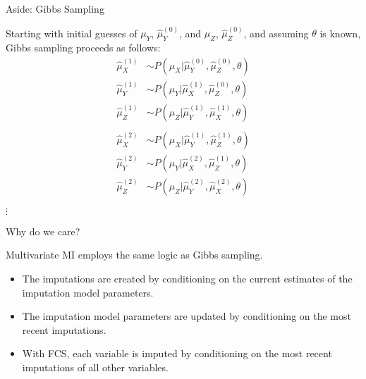 \documentclass[10pt]{beamer}\usepackage[]{graphicx}\usepackage[]{color}
\begin{document}
\begin{frame}{Aside: Gibbs Sampling}
  
  Starting with initial guesses of $\mu_Y$, $\hat{\mu}_Y^{(0)}$, and
  $\mu_Z$, $\hat{\mu}_Z^{(0)}$, and assuming $\theta$ is known, Gibbs
  sampling proceeds as follows:
  \begin{align*}
    \hat{\mu}_X^{(1)} &\sim P(\mu_X | \hat{\mu}_Y^{(0)}, \hat{\mu}_Z^{(0)}, \theta)\\
    \hat{\mu}_Y^{(1)} &\sim P(\mu_Y | \hat{\mu}_X^{(1)}, \hat{\mu}_Z^{(0)}, \theta)\\
    \hat{\mu}_Z^{(1)} &\sim P(\mu_Z | \hat{\mu}_Y^{(1)}, \hat{\mu}_X^{(1)}, \theta)\\
    \\
    \hat{\mu}_X^{(2)} &\sim P(\mu_X | \hat{\mu}_Y^{(1)}, \hat{\mu}_Z^{(1)}, \theta)\\
    \hat{\mu}_Y^{(2)} &\sim P(\mu_Y | \hat{\mu}_X^{(2)}, \hat{\mu}_Z^{(1)}, \theta)\\
    \hat{\mu}_Z^{(2)} &\sim P(\mu_Z | \hat{\mu}_Y^{(2)}, \hat{\mu}_X^{(2)}, \theta)
  \end{align*}
  \vspace{-40pt}
  \begin{center}\huge{$\vdots$}\end{center}
  
\end{frame}


\begin{frame}{Why do we care?}
  
  Multivariate MI employs the same logic as Gibbs sampling.
  \vb
  \begin{itemize}
  \item The imputations are created by conditioning on the current estimates of 
    the imputation model parameters.
    \vb
  \item The imputation model parameters are updated by conditioning on the most 
    recent imputations.
    \vb
  \item With FCS, each variable is imputed by conditioning on the most recent 
    imputations of all other variables.
  \end{itemize}
  
\end{frame}

\end{document}
